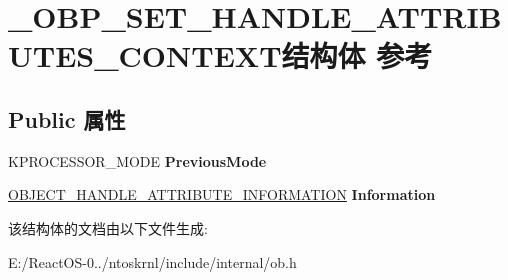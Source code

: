 \hypertarget{struct___o_b_p___s_e_t___h_a_n_d_l_e___a_t_t_r_i_b_u_t_e_s___c_o_n_t_e_x_t}{}\section{\+\_\+\+O\+B\+P\+\_\+\+S\+E\+T\+\_\+\+H\+A\+N\+D\+L\+E\+\_\+\+A\+T\+T\+R\+I\+B\+U\+T\+E\+S\+\_\+\+C\+O\+N\+T\+E\+X\+T结构体 参考}
\label{struct___o_b_p___s_e_t___h_a_n_d_l_e___a_t_t_r_i_b_u_t_e_s___c_o_n_t_e_x_t}
\subsection*{Public 属性}
\begin{DoxyCompactItemize}
\item 
\mbox{\label{struct___o_b_p___s_e_t___h_a_n_d_l_e___a_t_t_r_i_b_u_t_e_s___c_o_n_t_e_x_t_aeca616348c5a296468f114f64970efc4}} 
K\+P\+R\+O\+C\+E\+S\+S\+O\+R\+\_\+\+M\+O\+DE {\bfseries Previous\+Mode}
\item 
\mbox{\label{struct___o_b_p___s_e_t___h_a_n_d_l_e___a_t_t_r_i_b_u_t_e_s___c_o_n_t_e_x_t_a27747e0ecbfdf58da3cf6f86e15c5b9f}} 
\hyperlink{struct___o_b_j_e_c_t___h_a_n_d_l_e___a_t_t_r_i_b_u_t_e___i_n_f_o_r_m_a_t_i_o_n}{O\+B\+J\+E\+C\+T\+\_\+\+H\+A\+N\+D\+L\+E\+\_\+\+A\+T\+T\+R\+I\+B\+U\+T\+E\+\_\+\+I\+N\+F\+O\+R\+M\+A\+T\+I\+ON} {\bfseries Information}
\end{DoxyCompactItemize}


该结构体的文档由以下文件生成\+:\begin{DoxyCompactItemize}
\item 
E\+:/\+React\+O\+S-\/0../ntoskrnl/include/internal/ob.\+h\end{DoxyCompactItemize}
